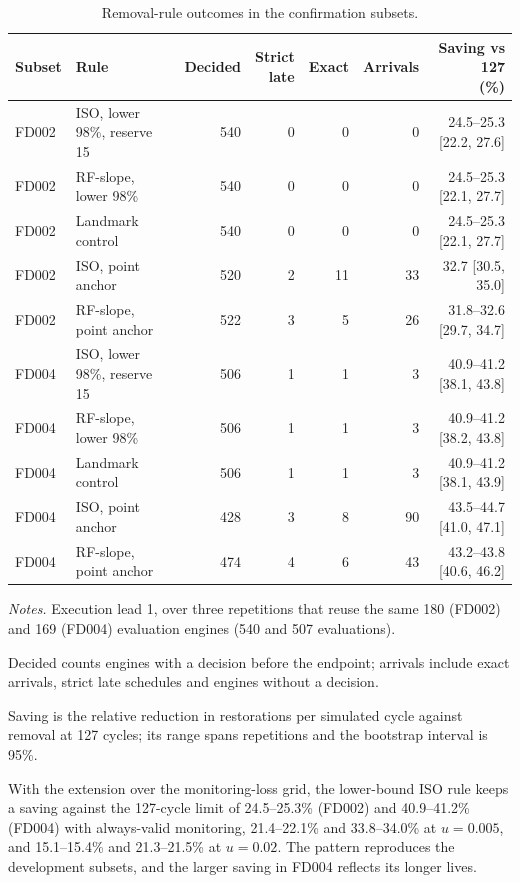 \documentclass[preprint,12pt]{elsarticle}
\newcommand{\tablenotes}[1]{\par\smallskip\begin{minipage}{\linewidth}\footnotesize\raggedright\setlength{\parindent}{0pt}\setlength{\parskip}{0.35\baselineskip}\textit{Notes.} #1\end{minipage}}
\begin{document}
\begin{table}[htbp]
\centering
\caption{Removal-rule outcomes in the confirmation subsets.}
\label{tab:confirmation}
\footnotesize
\setlength{\tabcolsep}{3pt}
\begin{tabularx}{\linewidth}{@{}lXrrrrr@{}}
\toprule
Subset & Rule & Decided & \shortstack{Strict\\late} & Exact & Arrivals & \shortstack{Saving vs 127\\(\%)} \\
\midrule
FD002 & ISO, lower 98\%, reserve 15 & 540 & 0 & 0 & 0 & 24.5--25.3 [22.2, 27.6] \\
FD002 & RF-slope, lower 98\% & 540 & 0 & 0 & 0 & 24.5--25.3 [22.1, 27.7] \\
FD002 & Landmark control & 540 & 0 & 0 & 0 & 24.5--25.3 [22.1, 27.7] \\
FD002 & ISO, point anchor & 520 & 2 & 11 & 33 & 32.7 [30.5, 35.0] \\
FD002 & RF-slope, point anchor & 522 & 3 & 5 & 26 & 31.8--32.6 [29.7, 34.7] \\
FD004 & ISO, lower 98\%, reserve 15 & 506 & 1 & 1 & 3 & 40.9--41.2 [38.1, 43.8] \\
FD004 & RF-slope, lower 98\% & 506 & 1 & 1 & 3 & 40.9--41.2 [38.2, 43.8] \\
FD004 & Landmark control & 506 & 1 & 1 & 3 & 40.9--41.2 [38.1, 43.9] \\
FD004 & ISO, point anchor & 428 & 3 & 8 & 90 & 43.5--44.7 [41.0, 47.1] \\
FD004 & RF-slope, point anchor & 474 & 4 & 6 & 43 & 43.2--43.8 [40.6, 46.2] \\
\bottomrule
\end{tabularx}
\tablenotes{Execution lead 1, over three repetitions that reuse the same 180 (FD002) and 169 (FD004) evaluation engines (540 and 507 evaluations).

Decided counts engines with a decision before the endpoint; arrivals include exact arrivals, strict late schedules and engines without a decision.

Saving is the relative reduction in restorations per simulated cycle against removal at 127 cycles; its range spans repetitions and the bootstrap interval is 95\%.}
\end{table}

With the extension over the monitoring-loss grid, the lower-bound ISO rule keeps a saving against the 127-cycle limit of 24.5--25.3\% (FD002) and 40.9--41.2\% (FD004) with always-valid monitoring, 21.4--22.1\% and 33.8--34.0\% at $u=0.005$, and 15.1--15.4\% and 21.3--21.5\% at $u=0.02$. The pattern reproduces the development subsets, and the larger saving in FD004 reflects its longer lives.
\end{document}
